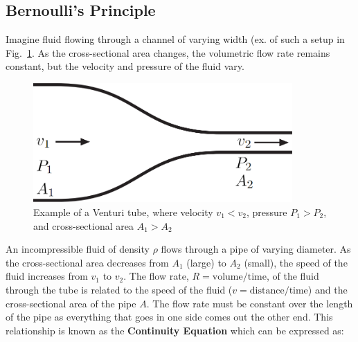 




\subsection{Bernoulli's Principle}

Imagine fluid flowing through a channel of varying width (ex. of such a setup in Fig.~\ref{M08_fluids_Fig07}. As the cross-sectional area changes, the volumetric flow rate remains constant, but the velocity and pressure of the fluid vary.

\begin{figure}[ht]
  \begin{center}
    \includegraphics[width=3.9in]{Fall/Experiment08Figures_Fluids/M08_fig07.png}
  \end{center}
  \caption{Example of a Venturi tube, where velocity $v_1 < v_2$, pressure $P_1 > P_2$, and cross-sectional area $A_1 > A_2$}  \label{M08_fluids_Fig07}
\end{figure}

An incompressible fluid of density $\rho$ flows through a pipe of varying diameter. As the cross-sectional area decreases
from $A_1$ (large) to $A_2$ (small), the speed of the fluid increases from $v_1$ to $v_2$. The flow rate, $R = \text{volume}/\text{time}$, of the fluid through the tube is related to the speed of the fluid ($v = \text{distance}/\text{time}$) and the cross-sectional area of the pipe $A$. The flow rate must be constant over the length of the pipe as everything that goes in one side comes out the other end. This relationship is known as the \textbf{Continuity Equation} which can be expressed as:

